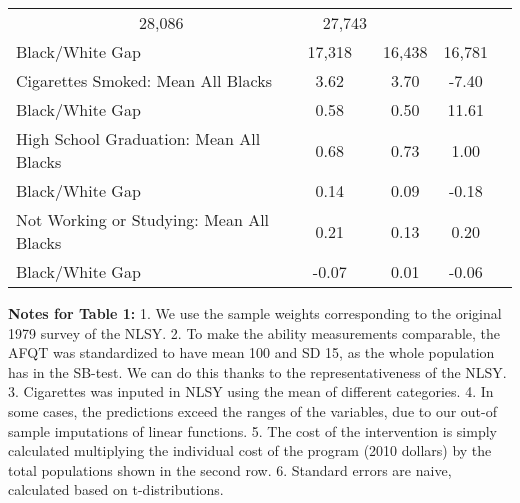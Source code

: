 \begin{table}[htbp]
\begin{center}
\begin{tabular}{lccccccc}
\multicolumn{2}{c}{      28,086} &
\multicolumn{2}{c}{      27,743} &
 \\[0.2cm]  
Black/White Gap &\multicolumn{2}{c}{      17,318} &
\multicolumn{2}{c}{      16,438} &
\multicolumn{2}{c}{      16,781} &
 \\[0.2cm]  
Cigarettes Smoked: Mean All Blacks &\multicolumn{2}{c}{        3.62} &
\multicolumn{2}{c}{        3.70} &
\multicolumn{2}{c}{       -7.40} &
 \\[0.2cm]  
Black/White Gap &\multicolumn{2}{c}{        0.58} &
\multicolumn{2}{c}{        0.50} &
\multicolumn{2}{c}{       11.61} &
 \\[0.2cm]  
High School Graduation: Mean All Blacks &\multicolumn{2}{c}{        0.68} &
\multicolumn{2}{c}{        0.73} &
\multicolumn{2}{c}{        1.00} &
 \\[0.2cm]  
Black/White Gap &\multicolumn{2}{c}{        0.14} &
\multicolumn{2}{c}{        0.09} &
\multicolumn{2}{c}{       -0.18} &
 \\[0.2cm]  
Not Working or Studying: Mean All Blacks &\multicolumn{2}{c}{        0.21} &
\multicolumn{2}{c}{        0.13} &
\multicolumn{2}{c}{        0.20} &
 \\[0.2cm]  
Black/White Gap &\multicolumn{2}{c}{       -0.07} &
\multicolumn{2}{c}{        0.01} &
\multicolumn{2}{c}{       -0.06} &
 \\[0.2cm]  
  \hline \hline    \end{tabular}
 \end{center} 
 
{\scriptsize 
{\bfseries Notes for Table 1:}
1. We use the sample weights corresponding to the original 1979 survey of the NLSY.
2. To make the ability measurements comparable, the AFQT was standardized to have mean 100 and SD 15, as the whole population has in the SB-test. We can do this thanks to the representativeness of the NLSY.
3. Cigarettes was inputed in NLSY using the mean of different categories.
4. In some cases, the predictions exceed the ranges of the variables, due to our out-of sample imputations of linear functions.
5. The cost of the intervention is simply calculated multiplying the individual cost of the program (2010 dollars) by the total populations shown in the second row.
6. Standard errors are naive, calculated based on t-distributions.
}
\end{table}


